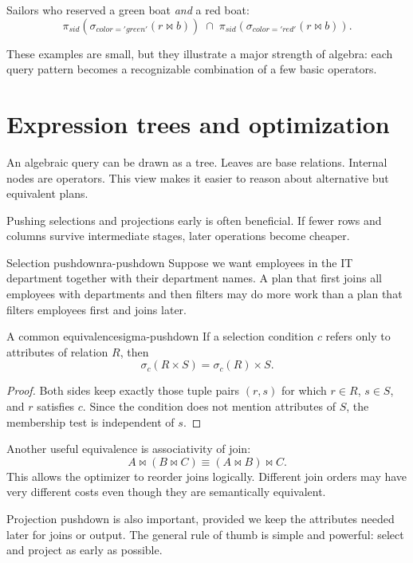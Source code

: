 \documentclass[11pt,a4paper,openany]{book}
\newcommand{\RAselect}{\sigma}
\newcommand{\RAproject}{\pi}
\newcommand{\join}{\bowtie}
\begin{document}
Sailors who reserved a green boat \emph{and} a red boat:
\[
\RAproject_{sid}(\RAselect_{color='green'}(r\join b))
\;\cap\;
\RAproject_{sid}(\RAselect_{color='red'}(r\join b)).
\]

These examples are small, but they illustrate a major strength of algebra: each query pattern becomes a recognizable combination of a few basic operators.

\section{Expression trees and optimization}
An algebraic query can be drawn as a tree. Leaves are base relations. Internal nodes are operators. This view makes it easier to reason about alternative but equivalent plans.

Pushing selections and projections early is often beneficial. If fewer rows and columns survive intermediate stages, later operations become cheaper.

\begin{example}{Selection pushdown}{ra-pushdown}
Suppose we want employees in the IT department together with their department names. A plan that first joins all employees with departments and then filters may do more work than a plan that filters employees first and joins later.
\end{example}

\begin{theorem}{A common equivalence}{sigma-pushdown}
If a selection condition \(c\) refers only to attributes of relation \(R\), then
\[
\RAselect_c(R \times S) = \RAselect_c(R) \times S.
\]
\end{theorem}

\begin{proof}
Both sides keep exactly those tuple pairs \((r,s)\) for which \(r \in R\), \(s \in S\), and \(r\) satisfies \(c\). Since the condition does not mention attributes of \(S\), the membership test is independent of \(s\).
\end{proof}

Another useful equivalence is associativity of join:
\[
A\join (B\join C)\equiv (A\join B)\join C.
\]
This allows the optimizer to reorder joins logically. Different join orders may have very different costs even though they are semantically equivalent.

Projection pushdown is also important, provided we keep the attributes needed later for joins or output. The general rule of thumb is simple and powerful: select and project as early as possible.
\end{document}
